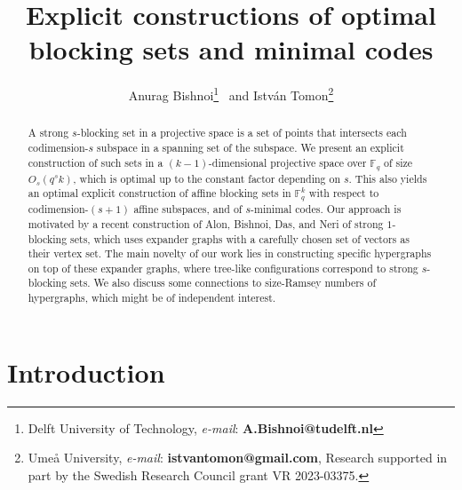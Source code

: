 \documentclass[11pt]{article}
\title{Explicit constructions of optimal blocking sets and minimal codes}
\author{Anurag Bishnoi\thanks{Delft University of Technology, \emph{e-mail}: \textbf{A.Bishnoi@tudelft.nl}} 
~and Istv\'an Tomon\thanks{Ume\r{a} University, \emph{e-mail}: \textbf{istvantomon@gmail.com}, Research supported in part by the Swedish Research Council grant VR 2023-03375.}}
\date{}
\theoremstyle{plain}
\theoremstyle{definition}
\begin{document}
	\sloppy 
	
	\maketitle
\begin{abstract}
 A strong $s$-blocking set in a projective space is a set of points that intersects each codimension-$s$ subspace in a spanning set of the subspace. We present an explicit construction of such sets in a $(k - 1)$-dimensional projective space over $\mathbb{F}_q$ of size $O_s(q^s k)$, which is optimal up to the constant factor depending on $s$. This also yields an optimal explicit construction of affine blocking sets in $\mathbb{F}_q^k$ with respect to codimension-$(s+1)$ affine subspaces, and of $s$-minimal codes. Our approach is motivated by a recent construction of Alon, Bishnoi, Das, and Neri of strong $1$-blocking sets, which uses expander graphs with a carefully chosen set of vectors as their vertex set. The main novelty of our work lies in constructing specific hypergraphs on top of these expander graphs, where tree-like configurations correspond to strong $s$-blocking sets. We also discuss some connections to size-Ramsey numbers of hypergraphs, which might be of independent interest.
\end{abstract}

\section{Introduction}
\end{document}
